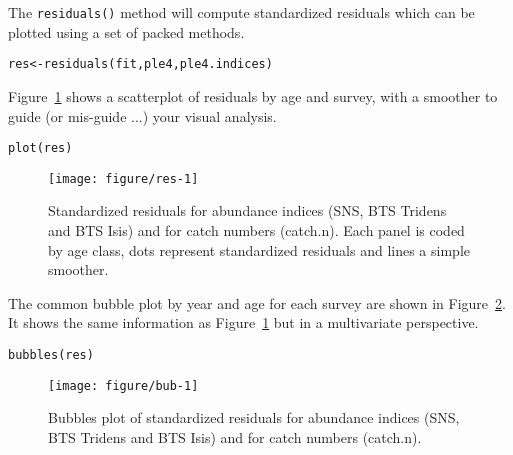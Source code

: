 \documentclass[a4paper,english,10pt]{article}\usepackage[]{graphicx}\usepackage[]{color}
\makeatletter
\def\maxwidth{ %
  \ifdim\Gin@nat@width>\linewidth
    \linewidth
  \else
    \Gin@nat@width
  \fi
}
\newcommand{\hlstd}[1]{\textcolor[rgb]{0,0,0}{#1}}%
\newcommand{\hlkwb}[1]{\textcolor[rgb]{0.361,0.506,0.596}{#1}}%
\newcommand{\hlkwd}[1]{\textcolor[rgb]{0.361,0.506,0.596}{#1}}%
\newenvironment{kframe}{%
 \def\at@end@of@kframe{}%
 \ifinner\ifhmode%
  \def\at@end@of@kframe{\end{minipage}}%
  \begin{minipage}{\columnwidth}%
 \fi\fi%
 \def\FrameCommand##1{\hskip\@totalleftmargin \hskip-\fboxsep
 \colorbox{shadecolor}{##1}\hskip-\fboxsep
     \hskip-\linewidth \hskip-\@totalleftmargin \hskip\columnwidth}%
 \MakeFramed {\advance\hsize-\width
   \@totalleftmargin\z@ \linewidth\hsize
   \@setminipage}}%
 {\par\unskip\endMakeFramed%
 \at@end@of@kframe}
\newenvironment{knitrout}{}{} %
\newcommand{\code}[1]{{\texttt{#1}}}
\makeatother
\begin{document}
The \code{residuals()} method will compute standardized residuals which can be plotted using a set of packed methods.

\begin{knitrout}
\color{fgcolor}\begin{kframe}
\begin{alltt}
\hlstd{res} \hlkwb{<-} \hlkwd{residuals}\hlstd{(fit, ple4, ple4.indices)}
\end{alltt}
\end{kframe}
\end{knitrout}

Figure~\ref{fig:res} shows a scatterplot of residuals by age and survey, with a smoother to guide (or mis-guide ...) your visual analysis.

\begin{knitrout}
\color{fgcolor}\begin{kframe}
\begin{alltt}
\hlkwd{plot}\hlstd{(res)}
\end{alltt}
\end{kframe}\begin{figure}[H]

{\centering \texttt{[image: figure/res-1]} 

}

\caption[Standardized residuals for abundance indices (SNS, BTS Tridens and BTS Isis) and for catch numbers (catch]{Standardized residuals for abundance indices (SNS, BTS Tridens and BTS Isis) and for catch numbers (catch.n). Each panel is coded by age class, dots represent standardized residuals and lines a simple smoother.\label{fig:res}}
\end{figure}


\end{knitrout}

The common bubble plot by year and age for each survey are shown in Figure~\ref{fig:bub}. It shows the same information as Figure~\ref{fig:res} but in a multivariate perspective.

\begin{knitrout}
\color{fgcolor}\begin{kframe}
\begin{alltt}
\hlkwd{bubbles}\hlstd{(res)}
\end{alltt}
\end{kframe}\begin{figure}[H]

{\centering \texttt{[image: figure/bub-1]} 

}

\caption[Bubbles plot of standardized residuals for abundance indices (SNS, BTS Tridens and BTS Isis) and for catch numbers (catch]{Bubbles plot of standardized residuals for abundance indices (SNS, BTS Tridens and BTS Isis) and for catch numbers (catch.n).\label{fig:bub}}
\end{figure}


\end{knitrout}
\end{document}
